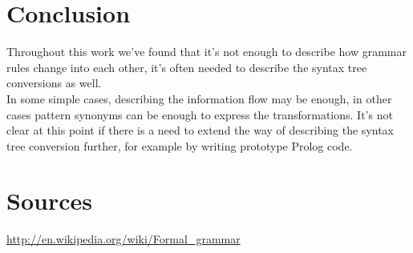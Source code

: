 \documentclass[a4paper]{article}
\begin{document}
\section*{Conclusion}
Throughout this work we've found that it's not enough to describe how grammar rules change into each other, it's often needed to describe the syntax tree conversions as well.\\
In some simple cases, describing the information flow may be enough, in other cases pattern synonyms can be enough to express the transformations. It's not clear at this point if there is a need to extend the way of describing the syntax tree conversion further, for example by writing prototype Prolog code.

\section*{Sources}
\url{http://en.wikipedia.org/wiki/Formal_grammar}
\end{document}
